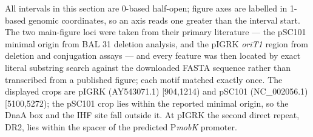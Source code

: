 All intervals in this section are 0-based half-open; figure axes are labelled
in 1-based genomic coordinates, so an axis reads one greater than the
interval start. The two main-figure loci were taken from their primary
literature --- the pSC101 minimal origin from BAL 31 deletion analysis, and
the pIGRK \emph{oriT1} region from deletion and conjugation assays
\cite{sugiura1993minimal,stenzel1987integration,nowak2021molecular} ---
and every feature was then located by exact literal substring search against
the downloaded FASTA sequence rather than transcribed from a published
figure; each motif matched exactly once.
The displayed crops are pIGRK (AY543071.1) [904,1214) and pSC101
(NC\_002056.1) [5100,5272); the pSC101 crop lies within the reported minimal
origin, so the DnaA box and the IHF site fall outside it. At pIGRK the second
direct repeat, DR2, lies within the spacer of the predicted P\emph{mobK}
promoter.

